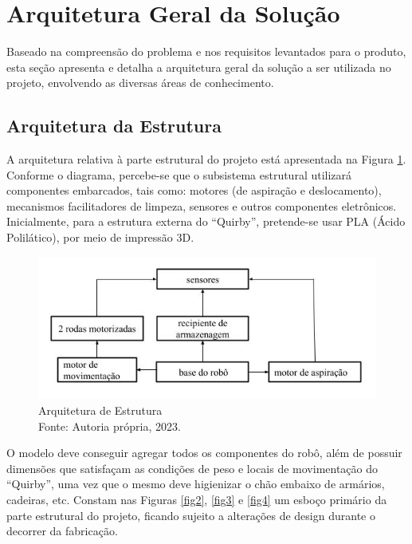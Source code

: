 \section{Arquitetura Geral da Solução}
 Baseado na compreensão do problema e nos requisitos levantados para o produto, esta seção apresenta e detalha a arquitetura geral da solução a ser utilizada no projeto, envolvendo as diversas áreas de conhecimento.
 
\subsection{Arquitetura da Estrutura}
A arquitetura relativa à parte estrutural do projeto está apresentada na Figura \ref{arq estrut}.
Conforme o diagrama, percebe-se que o subsistema estrutural utilizará componentes embarcados, tais como: motores (de aspiração e deslocamento), mecanismos facilitadores de limpeza, sensores e outros componentes eletrônicos.
Inicialmente, para a estrutura externa do “Quirby”, pretende-se usar PLA (Ácido Polilático), por meio de impressão 3D.

\begin{figure}[h!]
\begin{center}
\includegraphics[width=\textwidth]{figuras/ar_estrut.png}
\caption{Arquitetura de Estrutura \\ Fonte: Autoria própria, 2023.}
\label{arq estrut}
\end{center}
\end{figure}

 O modelo deve conseguir agregar todos os componentes do robô, além de possuir dimensões que satisfaçam as condições de peso e locais de movimentação do “Quirby”, uma vez que o mesmo deve higienizar o chão embaixo de armários, cadeiras, etc.  
Constam nas Figuras \ref{fig2}, \ref{fig3} e \ref{fig4} um esboço primário da parte estrutural do projeto, ficando sujeito a alterações de design durante o decorrer da fabricação.
\\
\\
\\
\\  

